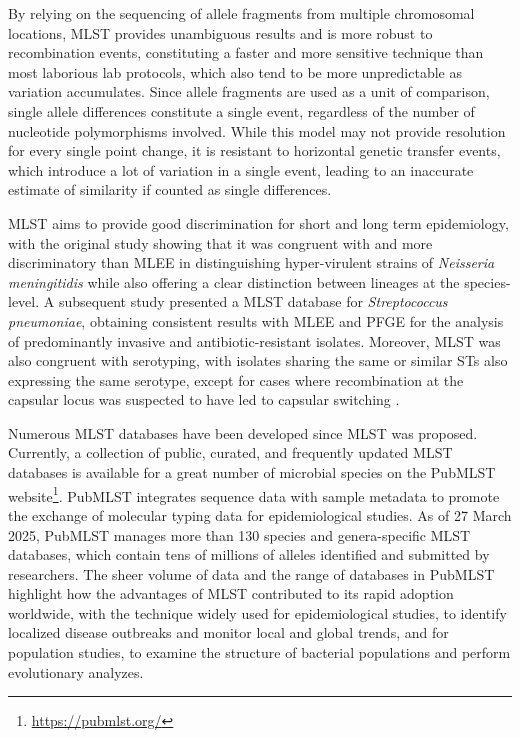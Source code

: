 By relying on the sequencing of allele fragments from multiple chromosomal locations, \ac{MLST} provides unambiguous results and is more robust to recombination events, constituting a faster and more sensitive technique than most laborious lab protocols, which also tend to be more unpredictable as variation accumulates. Since allele fragments are used as a unit of comparison, single allele differences constitute a single event, regardless of the number of nucleotide polymorphisms involved. While this model may not provide resolution for every single point change, it is resistant to horizontal genetic transfer events, which introduce a lot of variation in a single event, leading to an inaccurate estimate of similarity if counted as single differences.

\ac{MLST} aims to provide good discrimination for short and long term epidemiology, with the original study showing that it was congruent with and more discriminatory than \ac{MLEE} in distinguishing hyper-virulent strains of \textit{Neisseria meningitidis} while also offering a clear distinction between lineages at the species-level. A subsequent study presented a \ac{MLST} database for \textit{Streptococcus pneumoniae}, obtaining consistent results with \ac{MLEE} and \ac{PFGE} for the analysis of predominantly invasive and antibiotic-resistant isolates. Moreover, \ac{MLST} was also congruent with serotyping, with isolates sharing the same or similar \ac{ST}s also expressing the same serotype, except for cases where recombination at the capsular locus was suspected to have led to capsular switching \cite{enright_multilocus_1999}.

Numerous \ac{MLST} databases have been developed since \ac{MLST} was proposed. Currently, a collection of public, curated, and frequently updated \ac{MLST} databases is available for a great number of microbial species on the PubMLST website\footnote{\url{https://pubmlst.org/}}. PubMLST integrates sequence data with sample metadata to promote the exchange of molecular typing data for epidemiological studies. As of 27 March 2025, PubMLST manages more than 130 species and genera-specific \ac{MLST} databases, which contain tens of millions of alleles identified and submitted by researchers. The sheer volume of data and the range of databases in PubMLST highlight how the advantages of \ac{MLST} contributed to its rapid adoption worldwide, with the technique widely used for epidemiological studies, to identify localized disease outbreaks and monitor local and global trends, and for population studies, to examine the structure of bacterial populations and perform evolutionary analyzes.

